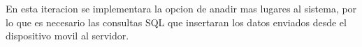 En esta iteracion se implementara la opcion de anadir mas lugares al sistema, por lo que es necesario las consultas SQL que insertaran los datos enviados desde el dispositivo movil al servidor. \\
